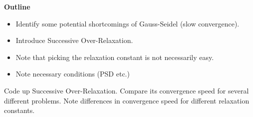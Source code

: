 

{\bf Outline}
\begin{itemize}
\item Identify some potential shortcomings of Gauss-Seidel (slow convergence).
\item Introduce Successive Over-Relaxation.
\item Note that picking the relaxation constant is not necessarily easy.
\item Note necessary conditions (PSD etc.)
\end{itemize}

\begin{problem}
Code up Successive Over-Relaxation. Compare its convergence speed for several different problems. Note differences in convergence speed for different relaxation constants.
\end{problem}
